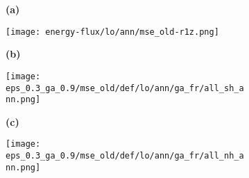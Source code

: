 \documentclass[preview]{standalone}
\begin{document}
\begin{figure}

  \begin{subfigure}[t]{0.05\textwidth}
    \textbf{\large{(a)}}
  \end{subfigure}
  \begin{subfigure}[t]{0.95\textwidth}
    \texttt{[image: energy-flux/lo/ann/mse\_old-r1z.png]}
  \end{subfigure}


  \begin{subfigure}[t]{0.05\textwidth}
    \textbf{\large{(b)}}
  \end{subfigure}
  \begin{subfigure}[t]{0.45\textwidth}
    \texttt{[image: eps\_0.3\_ga\_0.9/mse\_old/def/lo/ann/ga\_fr/all\_sh\_ann.png]}
  \end{subfigure}
  \begin{subfigure}[t]{0.05\textwidth}
    \textbf{\large{(c)}}
  \end{subfigure}
  \begin{subfigure}[t]{0.45\textwidth}
    \texttt{[image: eps\_0.3\_ga\_0.9/mse\_old/def/lo/ann/ga\_fr/all\_nh\_ann.png]}
  \end{subfigure}

\end{figure}
\end{document}
